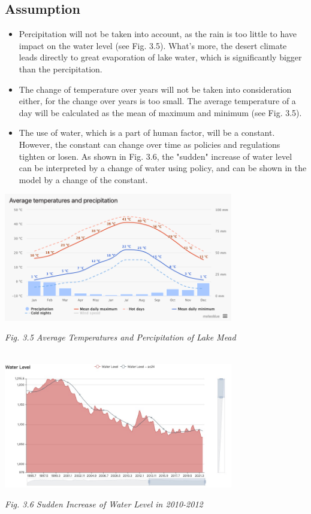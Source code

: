 \documentclass[12pt]{article}
\theoremstyle{definition}
\theoremstyle{remark}
\numberwithin{equation}{section}
\begin{document}
	\subsection{Assumption}
		\begin{itemize}
			\item Percipitation will not be taken into account, as the rain is too little to have impact on the water level (see Fig. 3.5). What's more, the desert climate leads directly to great evaporation of lake water, which is significantly bigger than the percipitation.
			\item  The change of temperature over years will not be taken into consideration either, for the change over years is too small. The average temperature of a day will be calculated as the mean of maximum and minimum (see Fig. 3.5).
			\item The use of water, which is a part of human factor, will be a constant. However, the constant can change over time as policies and regulations tighten or losen. As shown in Fig. 3.6, the "sudden"  increase of water level can be interpreted by a change of water using policy, and can be shown in the model by a change of the constant.
		\end{itemize}

		\begin{center}
			\includegraphics[width=10cm]{3.5 Average Temperatures and Percipitation of Lake Mead.png}
			
			\small \textit{Fig. 3.5 Average Temperatures and Percipitation of Lake Mead \cite{Temperature and Percipitation Data}}
			
			~\\

			\includegraphics[width=10cm]{3.6 Sudden Increase of Water Level in 2010-2012.jpg}
			
			\small \textit{Fig. 3.6 Sudden Increase of Water Level in 2010-2012}
		\end{center}
		
\end{document}
